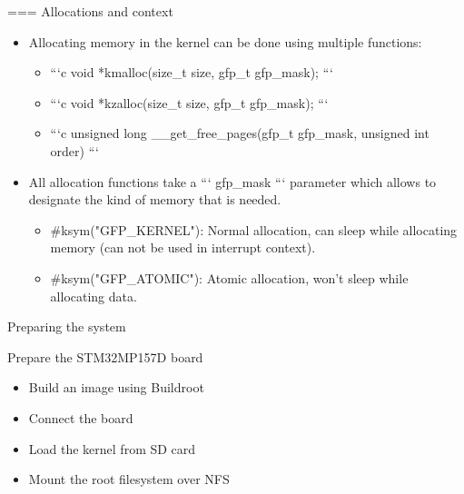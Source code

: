 === Allocations and context
  \begin{itemize}
    \item Allocating memory in the kernel can be done using multiple functions:
    \begin{itemize}
      \item ```c void *kmalloc(size_t size, gfp_t gfp_mask); ``` \item ```c void *kzalloc(size_t size, gfp_t gfp_mask); ``` \item ```c unsigned long __get_free_pages(gfp_t gfp_mask, unsigned int order) ```
    \end{itemize}
    \item All allocation functions take a ``` gfp_mask ``` parameter which allows to
          designate the kind of memory that is needed.
    \begin{itemize}
      \item #ksym("GFP_KERNEL"): Normal allocation, can sleep while allocating
            memory (can not be used in interrupt context).
      \item #ksym("GFP_ATOMIC"): Atomic allocation, won't sleep while allocating
            data.
    \end{itemize}
  \end{itemize}


\setuplabframe
{Preparing the system}
{
  Prepare the STM32MP157D board
  \begin{itemize}
    \item Build an image using Buildroot
    \item Connect the board
    \item Load the kernel from SD card
    \item Mount the root filesystem over NFS
  \end{itemize}
}
